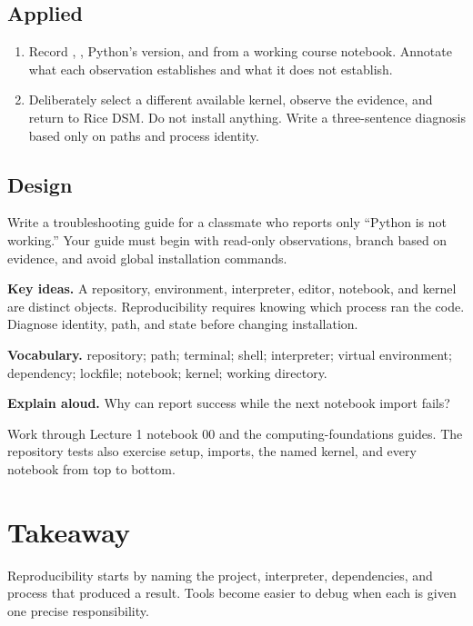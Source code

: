 \subsection*{Applied}

\begin{enumerate}
  \item Record , , Python's version, and
   from a working course notebook. Annotate what
  each observation establishes and what it does not establish.
  \item Deliberately select a different available kernel, observe the evidence,
  and return to Rice DSM. Do not install anything. Write a three-sentence
  diagnosis based only on paths and process identity.
\end{enumerate}

\subsection*{Design}

Write a troubleshooting guide for a classmate who reports only ``Python is not
working.'' Your guide must begin with read-only observations, branch based on
evidence, and avoid global installation commands.

\begin{chapterreview}
\textbf{Key ideas.} A repository, environment, interpreter, editor, notebook,
and kernel are distinct objects. Reproducibility requires knowing which process
ran the code. Diagnose identity, path, and state before changing installation.

\textbf{Vocabulary.} repository; path; terminal; shell; interpreter; virtual
environment; dependency; lockfile; notebook; kernel; working directory.

\textbf{Explain aloud.} Why can  report success while the
next notebook import fails?
\end{chapterreview}

\begin{notebooklink}
Work through Lecture 1 notebook 00 and the computing-foundations guides. The
repository tests also exercise setup, imports, the named kernel, and every
notebook from top to bottom.
\end{notebooklink}

\section{Takeaway}

Reproducibility starts by naming the project, interpreter, dependencies, and
process that produced a result. Tools become easier to debug when each is given
one precise responsibility.
